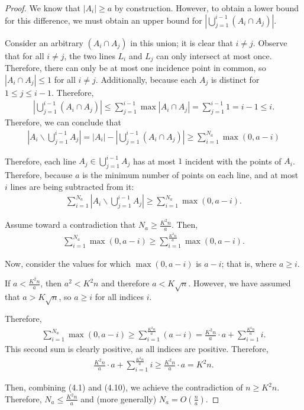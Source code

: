\documentclass{scrippsthesisclass}
\theoremstyle{definition}
\begin{document}
\begin{proof}
    We know that $|A_i| \geq a$ by construction.
    However, to obtain a lower bound for this difference, we must obtain an upper bound for $\left|\bigcup_{j=1}^{i-1} (A_i \cap A_j)\right|$. 

    Consider an arbitrary $(A_i \cap A_j)$ in this union; it is clear that $i \neq j$. 
    Observe that for all $i \neq j$, the two lines $L_i$ and $L_j$ can only intersect at most once. 
    Therefore, there can only be at most one incidence point in common, so $|A_i \cap A_j| \leq 1$ for all $i \neq j$. 
    Additionally, because each $A_j$ is distinct for $1 \leq j \leq i - 1$. 
    Therefore, 
    \begin{align}
        \left|\bigcup_{j=1}^{i-1} (A_i \cap A_j)\right| \leq \sum_{j=1}^{i-1} \max |A_i \cap A_j| = \sum_{j=1}^{i-1} 1 = i -1 \leq i.
    \end{align}
    Therefore, we can conclude that 
    \begin{align}
        \left|A_i \backslash \bigcup_{j=1}^{i-1} A_j \right| = \left|A_i\right| - \left|\bigcup_{j=1}^{i-1} (A_i \cap A_j)\right| \geq \sum_{i=1}^{N_a} \max(0, a - i)
    \end{align}

    Therefore, each line $A_j \in \bigcup_{j=1}^{i-1} A_j$ has at most $1$ incident with the points of $A_i$. 
    Therefore, because $a$ is the minimum number of points on each line, and at most $i$ lines are being subtracted from it:
    \begin{align}
    \sum_{i=1}^{N_a} \left|A_i \backslash \bigcup_{j=1}^{i-1} A_j \right| \geq \sum_{i=1}^{N_a} \max(0, a -  i).
    \end{align}

    Assume toward a contradiction that $N_a \geq \frac{K^2n}{a}$. 
    Then, 
    \begin{align}
    \sum_{i=1}^{N_a} \max(0, a -  i) \geq \sum_{i=1}^{\frac{K^2n}{a}} \max(0, a -  i). 
    \end{align}

    Now, consider the values for which $\max(0, a -  i)$ is $a-i$; that is, where $a \geq i$. 

    If $a < \frac{K^2n}{a}$, then $a^2 < K^2n$ and therefore $a < K\sqrt{n}$.
    However, we have assumed that $a > K\sqrt{n}$, so $a \geq i$ for all indices $i$.

    Therefore, 
    \begin{align}
    \sum_{i=1}^{N_a} \max(0, a -  i) \geq \sum_{i=1}^{\frac{K^2n}{a}} (a - i) = \frac{K^2n}{a} \cdot a + \sum_{i=1}^{\frac{K^2n}{a}} i. 
    \end{align}
    This second sum is clearly positive, as all indices are positive. 
    Therefore, 
    \begin{align}
    \frac{K^2n}{a} \cdot a + \sum_{i=1}^{\frac{K^2n}{a}} i \geq \frac{K^2n}{a} \cdot a  = K^2n. 
    \end{align}

    Then, combining (4.1) and (4.10), we achieve the contradiction of $n \geq K^2n$. 
    Therefore, $N_a \leq \frac{K^2n}{a}$ and (more generally) $N_a = O\left(\frac{n}{a}\right)$. 
\end{proof}
\end{document}
